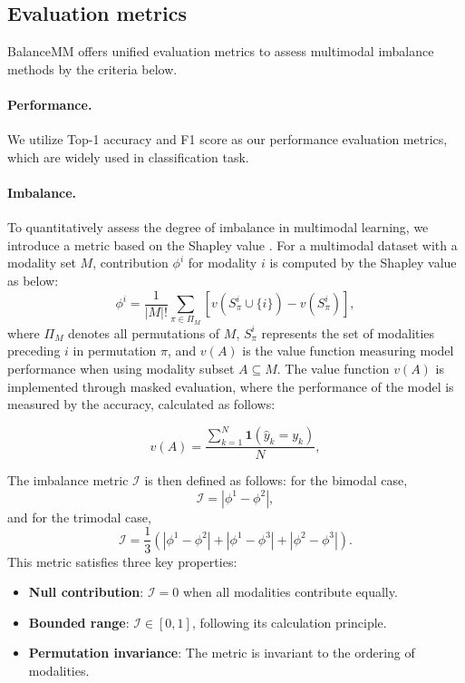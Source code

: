 \subsection{Evaluation metrics} \label{sec:tool4}
BalanceMM offers unified evaluation metrics to assess multimodal imbalance methods by the criteria below.

\paragraph{Performance.} We utilize Top-1 accuracy and F1 score as our performance evaluation metrics, which are widely used in classification task.

\paragraph{Imbalance.} To quantitatively assess the degree of imbalance in multimodal learning, we introduce a metric based on the Shapley value \cite{shapley:book1952}. For a multimodal dataset with a modality set $M$, contribution $\phi^i$ for modality $i$ is computed by the Shapley value as below:
\begin{equation} \label{equ:1}
\phi^i = \frac{1}{|M|!} \sum_{\pi \in \Pi_M} \left[ v(S_\pi^i \cup \{i\}) - v(S_\pi^i) \right] ,
\end{equation}
where $\Pi_M$ denotes all permutations of $M$, $S_\pi^i$ represents the set of modalities preceding $i$ in permutation $\pi$, and $v(A)$ is the value function measuring model performance when using modality subset $A \subseteq M$. 
The value function $v(A)$ is implemented through masked evaluation, where the performance of the model is measured by the accuracy, calculated as follows:

\begin{equation} \label{equ:2}
v(A) = \frac{\sum_{k=1}^{N} \mathbf{1}(\hat{y}_k = y_k)}{N},
\end{equation}

The imbalance metric $\mathcal{I}$ is then defined as follows: for the bimodal case, 
\begin{equation} \label{equ:4}
\mathcal{I} = |\phi^1 - \phi^2|,
\end{equation} and for the trimodal case, 
\begin{equation} \label{equ:5}
\mathcal{I} = \frac{1}{3}\left(|\phi^1-\phi^2| + |\phi^1-\phi^3| + |\phi^2-\phi^3|\right).
\end{equation}
This metric satisfies three key properties:
\begin{itemize}
    \item \textbf{Null contribution}: \(\mathcal{I} = 0\) when all modalities contribute equally.
    \item \textbf{Bounded range}: \(\mathcal{I} \in [0, 1]\), following its calculation principle.
    \item \textbf{Permutation invariance}: The metric is invariant to the ordering of modalities.
\end{itemize}

